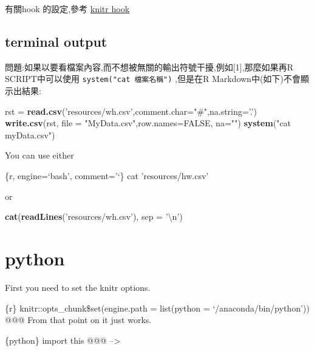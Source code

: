 \documentclass[]{book}
\newenvironment{Shaded}{\begin{snugshade}}{\end{snugshade}}
\newcommand{\CharTok}[1]{\textcolor[rgb]{0.31,0.60,0.02}{#1}}
\newcommand{\DataTypeTok}[1]{\textcolor[rgb]{0.13,0.29,0.53}{#1}}
\newcommand{\KeywordTok}[1]{\textcolor[rgb]{0.13,0.29,0.53}{\textbf{#1}}}
\newcommand{\NormalTok}[1]{#1}
\newcommand{\OtherTok}[1]{\textcolor[rgb]{0.56,0.35,0.01}{#1}}
\newcommand{\StringTok}[1]{\textcolor[rgb]{0.31,0.60,0.02}{#1}}
\theoremstyle{definition}
\theoremstyle{definition}
\theoremstyle{definition}
\theoremstyle{remark}
\begin{document}
有關hook 的設定,參考
\href{https://yihui.name/knitr/hooks/\#output-hooks}{knitr hook}

\hypertarget{terminal-output}{%
\subsection{terminal output}\label{terminal-output}}

問題:如果以要看檔案內容,而不想被無關的輸出符號干擾,例如{[}1{]},那麼如果再R
SCRIPT中可以使用 \texttt{system("cat\ 檔案名稱")} ,但是在R
Markdown中(如下)不會顯示出結果:

\begin{Shaded}
\begin{Highlighting}[]
\NormalTok{rst =}\StringTok{ }\KeywordTok{read.csv}\NormalTok{(}\StringTok{'resources/wh.csv'}\NormalTok{,}\DataTypeTok{comment.char=}\StringTok{"#"}\NormalTok{,}\DataTypeTok{na.string=}\StringTok{'.'}\NormalTok{)}
\KeywordTok{write.csv}\NormalTok{(rst, }\DataTypeTok{file =} \StringTok{"MyData.csv"}\NormalTok{,}\DataTypeTok{row.names=}\OtherTok{FALSE}\NormalTok{, }\DataTypeTok{na=}\StringTok{""}\NormalTok{)}
\KeywordTok{system}\NormalTok{(}\StringTok{"cat myData.csv"}\NormalTok{)}
\end{Highlighting}
\end{Shaded}

You can use either

\{r, engine=`bash', comment='`\} cat 'resources/hw.csv'

or

\begin{Shaded}
\begin{Highlighting}[]
\KeywordTok{cat}\NormalTok{(}\KeywordTok{readLines}\NormalTok{(}\StringTok{'resources/wh.csv'}\NormalTok{), }\DataTypeTok{sep =} \StringTok{'}\CharTok{\textbackslash{}n}\StringTok{'}\NormalTok{)}
\end{Highlighting}
\end{Shaded}

\hypertarget{python}{%
\section{python}\label{python}}

First you need to set the knitr options.

\{r\} knitr::opts\_chunk\$set(engine.path = list(python =
`/anaconda/bin/python')) @@@ From that point on it just works.

\{python\} import this @@@ --\textgreater{}
\end{document}
